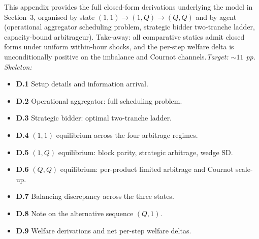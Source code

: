 \documentclass[11pt]{article}
\begin{document}
This appendix provides the full closed-form derivations underlying the model in Section~3, organised by state $(1,1) \to (1,Q) \to (Q,Q)$ and by agent (operational aggregator scheduling problem, strategic bidder two-tranche ladder, capacity-bound arbitrageur). Take-away: all comparative statics admit closed forms under uniform within-hour shocks, and the per-step welfare delta is unconditionally positive on the imbalance and Cournot channels.\hfill\emph{Target: $\sim 11$ pp.}
\\\emph{Skeleton:}
\begin{itemize}
  \item \textbf{D.1} Setup details and information arrival.
  \item \textbf{D.2} Operational aggregator: full scheduling problem.
  \item \textbf{D.3} Strategic bidder: optimal two-tranche ladder.
  \item \textbf{D.4} $(1,1)$ equilibrium across the four arbitrage regimes.
  \item \textbf{D.5} $(1,Q)$ equilibrium: block parity, strategic arbitrage, wedge SD.
  \item \textbf{D.6} $(Q,Q)$ equilibrium: per-product limited arbitrage and Cournot scale-up.
  \item \textbf{D.7} Balancing discrepancy across the three states.
  \item \textbf{D.8} Note on the alternative sequence $(Q,1)$.
  \item \textbf{D.9} Welfare derivations and net per-step welfare deltas.
\end{itemize}
\end{document}

